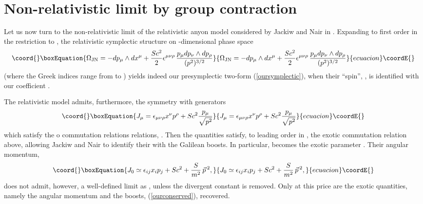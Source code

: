 \documentclass[a4paper,11pt]{article}
\let\ssection=\section
\renewcommand{\section}{\setcounter{equation}{0}\ssection}
\def\vp{{\vec p}}
\begin{document}
\section{Non-relativistic limit by group contraction}\label{NRlimit}

Let us now turn to the non-relativistic limit
of the relativistic anyon model \cite{JaNa} considered by
Jackiw and Nair in \cite{JaNa2}.
Expanding  to first order in \coordHE{} the restriction to
\myHighlight{$p_0\simeq mc^2+\vp{\,}^2/(2m)$}\coordHE{},
the relativistic symplectic structure on \coordHE{}-di\-men\-sio\-nal phase space
\begin{equation}\coord{}\boxEquation{
\Omega_{\mathrm{JN}}=-dp_\mu\wedge dx^\mu+\frac{Sc^2}{2}
\epsilon^{\mu\nu\rho}\,\frac{p_\mu{}dp_\nu\wedge{}dp_\rho}
{(p^2)^{3/2}}
\label{JNsymp}
}{
\Omega_{\mathrm{JN}}=-dp_\mu\wedge dx^\mu+\frac{Sc^2}{2}
\epsilon^{\mu\nu\rho}\,\frac{p_\mu{}dp_\nu\wedge{}dp_\rho}
{(p^2)^{3/2}}
}{ecuacion}\coordE{}\end{equation}
(where the Greek indices range from
\coordHE{} to \coordHE{}) yields indeed our
presymplectic two-form (\ref{oursymplectic}), when their ``spin'', \coordHE{}, is
identified with our coefficient \myHighlight{$\kappa$}\coordHE{}.
\goodbreak

The relativistic model admits, furthermore, the symmetry with generators
\begin{equation}\coord{}\boxEquation{
J_\mu=
\epsilon_{\mu\nu\rho}x^{\nu}p^\rho
+Sc^2\frac{p_{\mu}}{\sqrt{p^2}}
}{
J_\mu=
\epsilon_{\mu\nu\rho}x^{\nu}p^\rho
+Sc^2\frac{p_{\mu}}{\sqrt{p^2}}
}{ecuacion}\coordE{}\end{equation}
which satisfy the o\coordHE{} commutation relations relations,
\coordHE{}.
Then the quantities
\coordHE{}
satisfy, to leading order in \coordHE{},
the exotic commutation relation above,
allowing Jackiw and Nair to identify their \coordHE{}
with the Galilean boosts.
In particular, \coordHE{} becomes the exotic parameter
\myHighlight{$\kappa$}\coordHE{}.
Their angular momentum,
\begin{equation}\coord{}\boxEquation{
J_0\simeq\epsilon_{ij}x_ip_j+Sc^2+\frac{S}{m^2}\,\vp{\,}^2,
\label{JNangmom}
}{
J_0\simeq\epsilon_{ij}x_ip_j+Sc^2+\frac{S}{m^2}\,\vp{\,}^2,
}{ecuacion}\coordE{}\end{equation}
does not admit, however, a well-defined limit  as \coordHE{}, unless the
divergent constant  \coordHE{} is removed. Only at this price are the exotic
quantities, namely the angular momentum and the boosts, (\ref{ourconserved}),
recovered.
\end{document}
